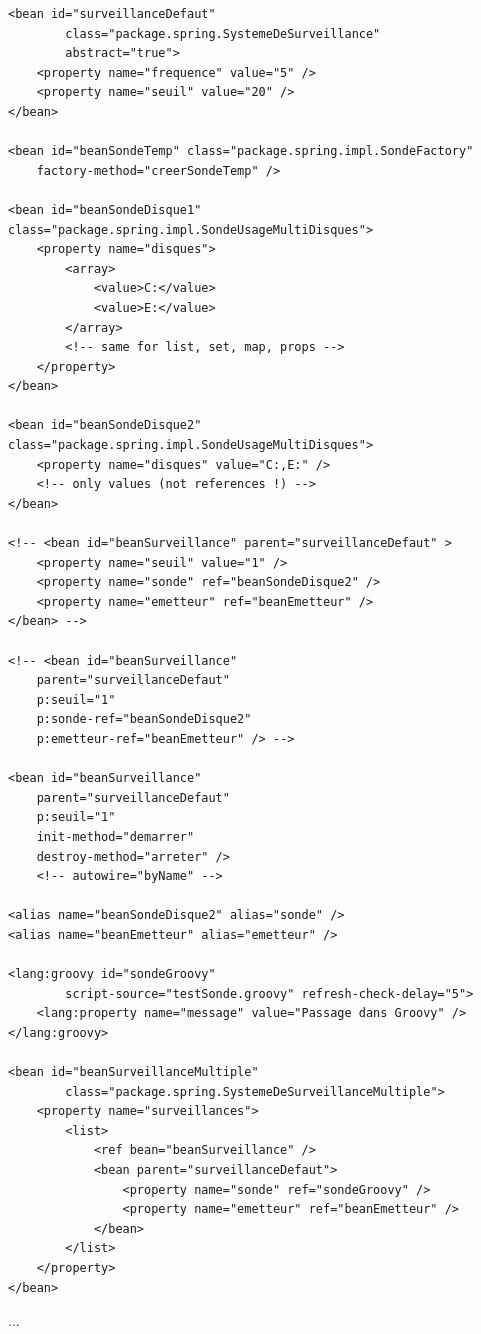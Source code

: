 \documentclass[11pt,twoside,a4paper]{article}
\begin{document}
\begin{landscape}
\begin{multicols}{2}
\begin{verbatim}
<bean id="surveillanceDefaut" 
        class="package.spring.SystemeDeSurveillance" 
        abstract="true">
    <property name="frequence" value="5" />
    <property name="seuil" value="20" />
</bean>

<bean id="beanSondeTemp" class="package.spring.impl.SondeFactory"
    factory-method="creerSondeTemp" />

<bean id="beanSondeDisque1" class="package.spring.impl.SondeUsageMultiDisques">
    <property name="disques">
        <array>
            <value>C:</value>
            <value>E:</value>
        </array>
        <!-- same for list, set, map, props -->
    </property>
</bean>

<bean id="beanSondeDisque2" class="package.spring.impl.SondeUsageMultiDisques">
    <property name="disques" value="C:,E:" />
    <!-- only values (not references !) -->
</bean>

<!-- <bean id="beanSurveillance" parent="surveillanceDefaut" >
    <property name="seuil" value="1" />
    <property name="sonde" ref="beanSondeDisque2" />
    <property name="emetteur" ref="beanEmetteur" />
</bean> -->

<!-- <bean id="beanSurveillance"
    parent="surveillanceDefaut"
    p:seuil="1"
    p:sonde-ref="beanSondeDisque2"
    p:emetteur-ref="beanEmetteur" /> -->

<bean id="beanSurveillance"
    parent="surveillanceDefaut"
    p:seuil="1"
    init-method="demarrer"
    destroy-method="arreter" />
    <!-- autowire="byName" -->

<alias name="beanSondeDisque2" alias="sonde" />
<alias name="beanEmetteur" alias="emetteur" />

<lang:groovy id="sondeGroovy"
        script-source="testSonde.groovy" refresh-check-delay="5">
    <lang:property name="message" value="Passage dans Groovy" />
</lang:groovy>

<bean id="beanSurveillanceMultiple"
        class="package.spring.SystemeDeSurveillanceMultiple">
    <property name="surveillances">
        <list>
            <ref bean="beanSurveillance" />
            <bean parent="surveillanceDefaut">
                <property name="sonde" ref="sondeGroovy" />
                <property name="emetteur" ref="beanEmetteur" />
            </bean>
        </list>
    </property>
</bean>
	\end{verbatim}
	\normalsize
	
	\vfill
	\columnbreak
	
	...
	
\end{multicols}

\clearpage

\end{landscape}
\end{document}
